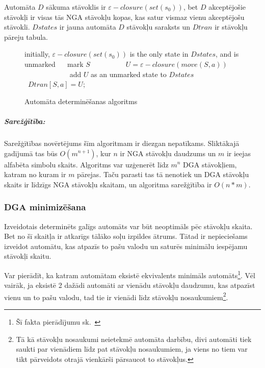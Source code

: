 Automāta $D$ sākuma stāvoklis ir $\varepsilon-closure(set(s_0))$, bet $D$ akceptējošie stāvokļi ir visas tās NGA stāvokļu kopas, kas satur vismaz vienu akceptējošu stāvokli. $Dstates$ ir jauna automāta $D$ stāvokļu saraksts un $Dtran$ ir stāvokļu pāreju tabula.

\begin{figure}[H]
  \begin{algorithmic}
  \State initially, $\varepsilon-closure (set (s_0))$  is the only state in $Dstates$, and is unmarked
      \State mark $S$
          \State $U = \varepsilon-closure (move (S, a))$
              \State add $U$ as an unmarked state to $Dstates$
          \EndIf
          \State $Dtran [S, a] = U$;
      \EndFor
  \EndWhile
  \end{algorithmic}
  \caption{\label{fig:det_algorithm}Automāta determinēšanas algoritms}
\end{figure}

\subparagraph{Sarežģītība:} Sarežģītības novērtējums šīm algoritmam ir diezgan nepatīkams. Sliktākajā gadījumā tas būs $O(m^{n+1})$, kur $n$ ir NGA stāvokļu daudzums un $m$ ir ieejas alfabēta simbolu skaits. Algoritms var uzģenerēt līdz $m^n$ DGA stāvokļiem, katram no kuram ir $m$ pārejas. Taču parasti tas tā nenotiek un DGA stāvokļu skaits ir līdzīgs NGA stāvokļu skaitam, un algoritma sarežģītība ir $O(n*m)$. \cite{DragonBook, Hopcroft:IntroAutomataTheory}

\subsubsection{\label{sbsbs:prot_minimization}DGA minimizēšana}

Izveidotais determinēts galīgs automāts var būt neoptimāls pēc stāvokļu skaita. Bet no šī skaitļa ir atkarīgs tālāko soļu izpildes ātrums. Tātad ir nepieciešams izveidot automātu, kas atpazīs to pašu valodu un saturēs minimālu iespējamu stāvokļi skaitu.

Var pierādīt, ka katram automātam eksistē ekvivalents minimāls automāts\footnote{Šī fakta pierādījumu sk.~\cite{Bassino:ComplexityMinimization}}. Vēl vairāk, ja eksistē 2 dažādi automāti ar vienādu stāvokļu daudzumu, kas atpazīst vienu un to pašu valodu, tad tie ir vienādi līdz stāvokļu nosaukumiem\footnote{Tā kā stāvokļu nosaukumi neietekmē automāta darbību, divi automāti tiek saukti par vienādiem līdz pat stāvokļu nosaukumiem, ja viens no tiem var tikt pārveidots otrajā vienkārši pārsaucot to stāvokļus.}.

